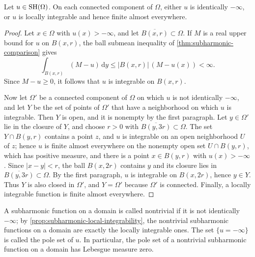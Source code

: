 \begin{proposition}\label{prop:subharmonic-local-integrability}
Let $u\in\mathrm{SH}(\Omega)$. On each connected component of $\Omega$, either $u$ is identically $-\infty$, or $u$ is locally integrable and hence finite almost everywhere.
\end{proposition}
\begin{proof}
Let $x\in\Omega$ with $u(x)>-\infty$, and let $\overline{B(x,r)}\subset\Omega$. If $M$ is a real upper bound for $u$ on $B(x,r)$, the ball submean inequality of \cref{thm:subharmonic-comparison} gives
\[
 \int_{B(x,r)}(M-u)\,\mathrm d y\leq|B(x,r)|\,(M-u(x))<\infty.
\]
Since $M-u\geq0$, it follows that $u$ is integrable on $B(x,r)$.

Now let $\Omega'$ be a connected component of $\Omega$ on which $u$ is not identically $-\infty$, and let $Y$ be the set of points of $\Omega'$ that have a neighborhood on which $u$ is integrable. Then $Y$ is open, and it is nonempty by the first paragraph. Let $y\in\Omega'$ lie in the closure of $Y$, and choose $r>0$ with $\overline{B(y,3r)}\subset\Omega$. The set $Y\cap B(y,r)$ contains a point $z$, and $u$ is integrable on an open neighborhood $U$ of $z$; hence $u$ is finite almost everywhere on the nonempty open set $U\cap B(y,r)$, which has positive measure, and there is a point $x\in B(y,r)$ with $u(x)>-\infty$. Since $|x-y|<r$, the ball $B(x,2r)$ contains $y$ and its closure lies in $\overline{B(y,3r)}\subset\Omega$. By the first paragraph, $u$ is integrable on $B(x,2r)$, hence $y\in Y$. Thus $Y$ is also closed in $\Omega'$, and $Y=\Omega'$ because $\Omega'$ is connected. Finally, a locally integrable function is finite almost everywhere.
\end{proof}

A subharmonic function on a domain is called nontrivial if it is not identically $-\infty$; by \cref{prop:subharmonic-local-integrability}, the nontrivial subharmonic functions on a domain are exactly the locally integrable ones. The set $\{u=-\infty\}$ is called the pole set of $u$. In particular, the pole set of a nontrivial subharmonic function on a domain has Lebesgue measure zero.

